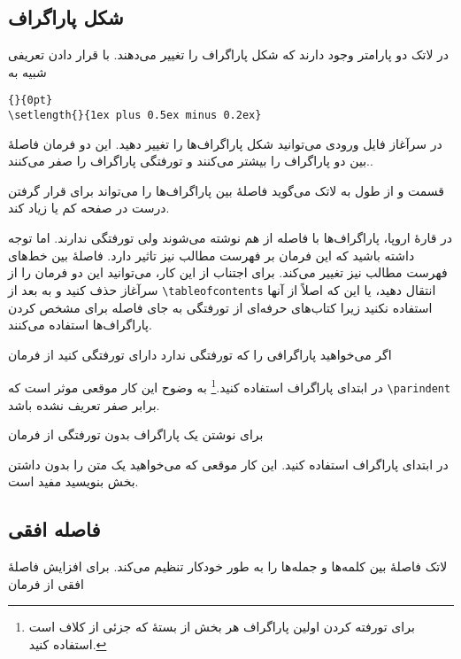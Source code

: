 \subsection{شکل پاراگراف}\label{parsp}
در لاتک دو پارامتر وجود دارند که شکل پاراگراف را تغییر می‌دهند. با قرار دادن تعریفی شبیه به 
\setLR
\begin{code}
\verb|{|\verb|}{0pt}| \\
\verb|\setlength{|\verb|}{1ex plus 0.5ex minus 0.2ex}|
\end{code}
\setRL
در سرآغاز فایل ورودی می‌توانید شکل پاراگراف‌ها را تغییر دهید. این دو فرمان فاصلهٔ بین دو پاراگراف را بیشتر می‌کنند و تورفتگی پاراگراف را صفر می‌کنند..

قسمت  و  از طول به لاتک می‌گوید فاصلهٔ بین پاراگراف‌ها را می‌تواند برای قرار گرفتن درست در صفحه کم یا زیاد کند.

در قارهٔ اروپا، پاراگراف‌ها با فاصله از هم نوشته می‌شوند ولی تورفتگی ندارند. اما توجه داشته باشید که این فرمان بر فهرست مطالب نیز تاثیر دارد. فاصلهٔ بین خط‌های فهرست مطالب نیز تغییر می‌کند. برای اجتناب از این کار، می‌توانید این دو فرمان را از سرآغاز حذف کنید و به بعد از  \verb|\tableofcontents| انتقال دهید، یا این که اصلاً از آنها استفاده نکنید زیرا کتاب‌های حرفه‌ای از تورفتگی به جای فاصله برای مشخص کردن پاراگراف‌ها استفاده می‌کنند.

اگر می‌خواهید پاراگرافی را که تورفتگی ندارد دارای تورفتگی کنید از فرمان 

\begin{lscommand}
\end{lscommand}

\noindent در ابتدای پاراگراف استفاده کنید.\footnote{برای تورفته کردن اولین پاراگراف هر بخش از بستهٔ   که جزئی از کلاف  است استفاده کنید.}
 به وضوح این کار موقعی موثر است که  \verb|\parindent| برابر صفر تعریف نشده باشد.

برای نوشتن یک پاراگراف بدون تورفتگی از فرمان 

\begin{lscommand}
\end{lscommand}

\noindent در ابتدای پاراگراف استفاده کنید. این کار موقعی که می‌خواهید یک متن را بدون داشتن بخش بنویسید مفید است.
\subsection{فاصله افقی}
\label{sec:hspace}
لاتک فاصلهٔ بین کلمه‌ها و جمله‌ها را به طور خودکار تنظیم می‌کند. برای افزایش فاصلهٔ افقی از فرمان  

